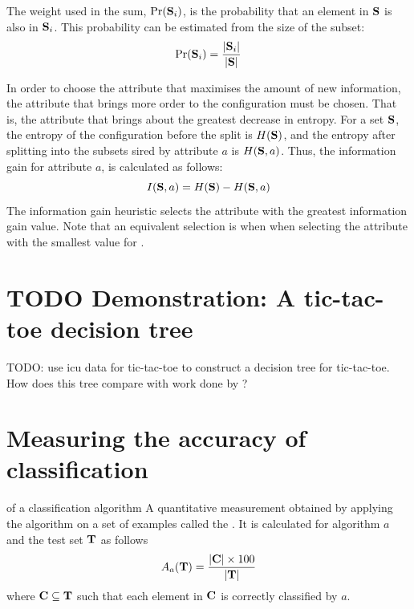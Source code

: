 The weight used in the sum, $\mbox{Pr}({\bf S}_i)$, is the probability that an element in ${\bf S}$ is also in ${\bf S}_i$.  This probability can be estimated from the size of the subset:
\begin{equation}
\mbox{Pr}({\bf S}_i) = \frac{|{\bf S}_i|}{|{\bf S}|}
\label{eq:subset_probability}
\end{equation}

In order to choose the attribute that maximises the amount of new information, the attribute that brings more order to the configuration must be chosen.  That is, the attribute that brings about the greatest decrease in entropy. For a set ${\bf S}$, the entropy of the configuration before the split is $H({\bf S})$, and the entropy after splitting into the subsets sired by attribute $a$ is $H({\bf S},a)$. Thus, the information gain for attribute $a$, is calculated as follows:
\begin{equation}
I({\bf S},a) = H({\bf S}) - H({\bf S},a)
\label{eq:gain}
\end{equation}
The information gain heuristic selects the attribute with the greatest information gain value. Note that an equivalent selection is when when selecting the attribute with the smallest value for . 
\section{TODO Demonstration: A tic-tac-toe decision tree}
TODO: use icu data for tic-tac-toe \cite{icu:data} to construct a decision tree for tic-tac-toe.  How does this tree compare with work done by \cite{utgoff:feature}?


\section{Measuring the accuracy of classification}
 {of a classification algorithm} {A quantitative measurement obtained by applying the algorithm on a set of examples called the . It is calculated for algorithm $a$ and the test set ${\bf T}$ as follows
\begin{equation}
A_a({\bf T}) = \frac{|{\bf C}| \times 100}{|{\bf T}|}
\end{equation}
where ${\bf C} \subseteq {\bf T}$ such that each element in ${\bf C} $ is correctly classified by $a$.
}  

